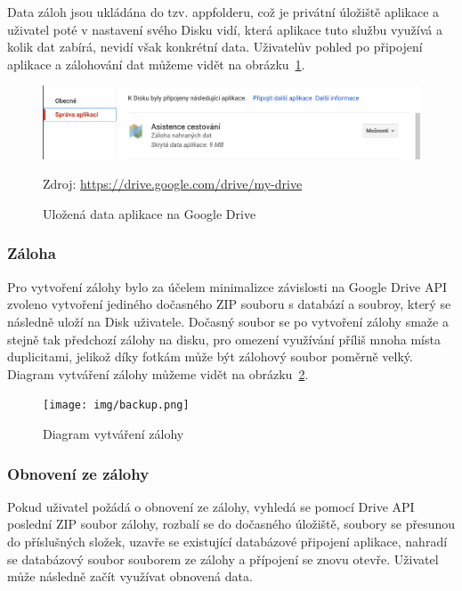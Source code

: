 \documentclass{article}
\begin{document}
 Data záloh jsou ukládána do tzv. appfolderu\cite{driveappfolder}, což je privátní úložiště aplikace
 a uživatel poté v nastavení svého Disku vidí,
  která aplikace tuto službu využívá a kolik dat zabírá, nevidí však konkrétní data.
  Uživatelův pohled po připojení aplikace a zálohování dat můžeme vidět na obrázku~\ref{fig:connecteddrive}.

\begin{figure}[H]
        \centering
                \includegraphics[scale=0.3]{img/connectedDrive.png}
        \caption{Uložená data aplikace na Google Drive}
        \label{fig:connecteddrive}
        \centering Zdroj: \url{https://drive.google.com/drive/my-drive}
\end{figure}

\subsubsection{Záloha}
Pro vytvoření zálohy bylo za účelem minimalizce závislosti na Google Drive API zvoleno vytvoření jediného
dočasného ZIP souboru s databází a soubroy, který se následně uloží na Disk uživatele. Dočasný soubor se po
vytvoření zálohy smaže a stejně tak předchozí zálohy na disku, pro omezení využívání příliš mnoha místa duplicitami,
jelikož díky fotkám může být zálohový soubor poměrně velký. Diagram vytváření zálohy můžeme vidět na obrázku~\ref{fig:backup}.

\begin{figure}[H]
        \centering
                \texttt{[image: img/backup.png]}
        \caption{Diagram vytváření zálohy}
        \label{fig:backup}
\end{figure}

\subsubsection{Obnovení ze zálohy}
Pokud uživatel požádá o obnovení ze zálohy, vyhledá se pomocí Drive API poslední ZIP soubor zálohy,
rozbalí se do dočasného úložiště, soubory se přesunou do příslušných složek, uzavře se existující
databázové připojení aplikace, nahradí se databázový soubor souborem ze zálohy a přípojení se znovu otevře.
Uživatel může následně začít využívat obnovená data.
\end{document}
